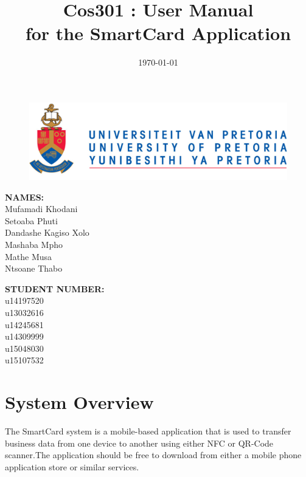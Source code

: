 \documentclass[english]{article}
\title{Cos301 : User Manual\\
	for the SmartCard Application\\
	}
\date{\today}
\begin{document}
	\maketitle
	\begin{figure}[!t]
		\includegraphics{up_logo.png}
	\end{figure}
	\begin{minipage}{0.4\textwidth}
		\begin{flushleft} \large
			\textbf{NAMES:}\\[0.4cm]
			Mufamadi {Khodani} \\
			Setoaba {Phuti} \\
			Dandashe {Kagiso Xolo} \\
			Mashaba {Mpho} \\
			Mathe {Musa} \\
			Ntsoane {Thabo}\\
		\end{flushleft}
	\end{minipage}
	\begin{minipage}{0.4\textwidth}
		\begin{flushright} \large
			\textbf{STUDENT NUMBER:} \\[0.4cm]
			u14197520 \\
			u13032616 \\
			u14245681 \\
			u14309999 \\
			u15048030 \\
			u15107532 \\
		\end{flushright}
\end{minipage}

	
	\newpage

	\tableofcontents
	

	
\newpage
	\section{System Overview}
	The SmartCard system is a mobile-based application that is used to transfer business data from one device to another using either NFC or QR-Code scanner.The application should be free to download from either a mobile phone application store or similar services. 
	
\end{document}
